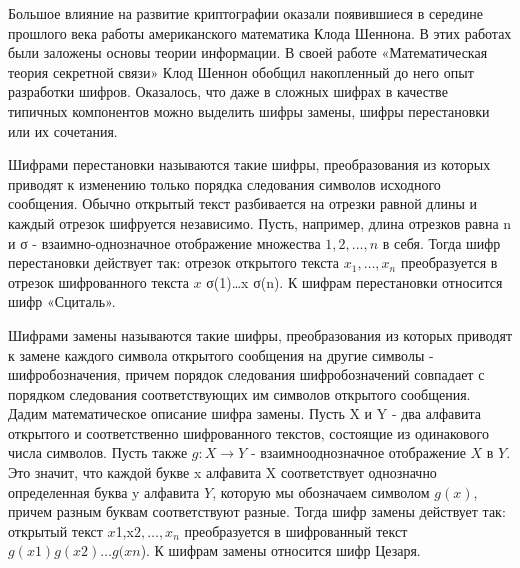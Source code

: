 Большое влияние на развитие криптографии оказали появившиеся в середине прошлого века работы американского математика Клода Шеннона. В этих работах были заложены основы теории информации. В своей работе «Математическая теория секретной связи» Клод Шеннон обобщил накопленный до него опыт разработки шифров. Оказалось, что даже в сложных шифрах в качестве типичных компонентов можно выделить шифры замены, шифры перестановки или их сочетания.

Шифрами перестановки называются такие шифры, преобразования из которых приводят к изменению только порядка следования символов исходного сообщения. Обычно открытый текст разбивается на отрезки равной длины и каждый отрезок шифруется независимо. Пусть, например, длина отрезков равна n и σ - взаимно-однозначное отображение множества ${1, 2, …, n}$ в себя. Тогда шифр перестановки действует так: отрезок открытого текста $x_1,…,x_n$ преобразуется в отрезок шифрованного текста $x$ σ(1)…x σ(n). К шифрам перестановки относится шифр «Сциталь».

Шифрами замены называются такие шифры, преобразования из которых приводят к замене каждого символа открытого сообщения на другие символы - шифробозначения, причем порядок следования шифробозначений совпадает с порядком следования соответствующих им символов открытого сообщения. Дадим математическое описание шифра замены. Пусть X и Y - два алфавита открытого и соответственно шифрованного текстов, состоящие из одинакового числа символов. Пусть также $g: X→Y$ - взаимнооднозначное отображение $X$ в $Y$. Это значит, что каждой букве x алфавита X соответствует однозначно определенная буква y алфавита $Y$, которую мы обозначаем символом $g(x)$, причем разным буквам соответствуют разные. Тогда шифр замены действует так: открытый текст $x$1,x$2,…,x_n$ преобразуется в шифрованный текст $g(x1) g(x2)… g(xn$). К шифрам замены относится шифр Цезаря. 
